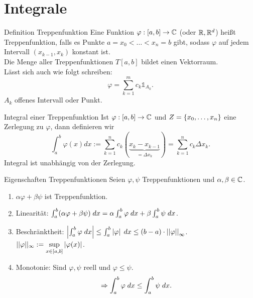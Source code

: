 \documentclass[main.tex]{subfiles}
\begin{document}
\section*{Integrale}

\begin{karte}{Definition Treppenfunktion}
    Eine Funktion \( \abb{\varphi}{[a,b]}{\C} \) (oder \( \R, \R^d \))
    heißt Treppenfunktion, falls es Punkte \( a = x_0 < \ldots < x_n = b \)
    gibt, sodass \( \varphi \) auf jedem Intervall \( (x_{k-1}, x_k) \) 
    konstant ist.\\
    Die Menge aller Treppenfunktionen \( T[a,b] \) bildet einen 
    Vektorraum.\\
    Lässt sich auch wie folgt schreiben:
    \[ \varphi = \sum_{k=1}^m c_k \mathds{1}_{A_k}. \]
    \( A_k \) offenes Intervall oder Punkt.
\end{karte}

\begin{karte}{Integral einer Treppenfunktion}
    Ist \( \abb{\varphi}{[a,b]}{\C} \) und \( Z = \set{x_0,\ldots, x_n} \)
    eine Zerlegung  zu \( \varphi \), dann definieren wir 
    \[ \int_a^b \varphi(x) dx 
    := \sum_{k=1}^n c_k (\underbrace{x_k - x_{k-1}}_{= \Delta x_k})
    = \sum_{k=1}^n c_k \Delta x_k. \]
    Integral ist unabhängig von der Zerlegung.
\end{karte}
\begin{karte}{Eigenschaften Treppenfunktionen}
    Seien \( \varphi, \psi \) Treppenfunktionen und 
    \( \alpha, \beta \in \C \).
    \begin{enumerate}
        \item \( \alpha \varphi + \beta \psi \) ist Treppenfunktion.
        \item Linearität: \( \integral{(\alpha \varphi + \beta \psi)}{a}{b} 
        = \alpha \integral{\varphi}{a}{b} 
        + \beta \integral{\psi}{a}{b} \).
        \item Beschränktheit: \( \abs{\integral{\varphi}{a}{b}}
        \leq \integral{\abs{\varphi}}{a}{b} \leq (b-a) \cdot \norm{\varphi}_\infty \). \\
        \( ||\varphi||_\infty 
        := \underset{x \in [a,b]}{\sup} \abs{\varphi(x)} \).
        \item Monotonie: Sind \( \varphi, \psi \) reell und 
        \( \varphi \leq \psi \).
        \[ \Rightarrow \integral{\varphi}{a}{b} 
        \leq \integral{\psi}{a}{b}. \]
    \end{enumerate}
\end{karte}
\end{document}
